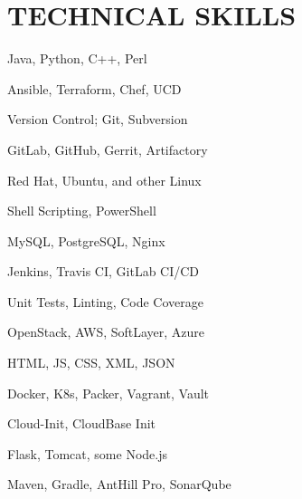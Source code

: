 \documentclass[]{dylan-resume}
\begin{document}
\begin{minipage}[t]{1.00\textwidth}

\section{TECHNICAL SKILLS}
\begin{center}
\begin{minipage}[b]{0.33333\textwidth}
\raggedright
Java, Python, C++, Perl \par
Ansible, Terraform, Chef, UCD \par
Version Control; Git, Subversion \par
GitLab, GitHub, Gerrit, Artifactory \par
Red Hat, Ubuntu, and other Linux \par
\end{minipage}%
\begin{minipage}[b]{0.33333\textwidth}
\centering
Shell Scripting, PowerShell \par
MySQL, PostgreSQL, Nginx \par
Jenkins, Travis CI, GitLab CI/CD \par
Unit Tests, Linting, Code Coverage \par
OpenStack, AWS, SoftLayer, Azure 
\end{minipage}%
\begin{minipage}[b]{0.33333\textwidth}
\raggedleft
HTML, JS, CSS, XML, JSON \par
Docker, K8s, Packer, Vagrant, Vault \par
Cloud-Init, CloudBase Init \par
Flask, Tomcat, some Node.js \par
Maven, Gradle, AntHill Pro, SonarQube
\end{minipage}
\end{center}


\end{minipage}
\end{document}
